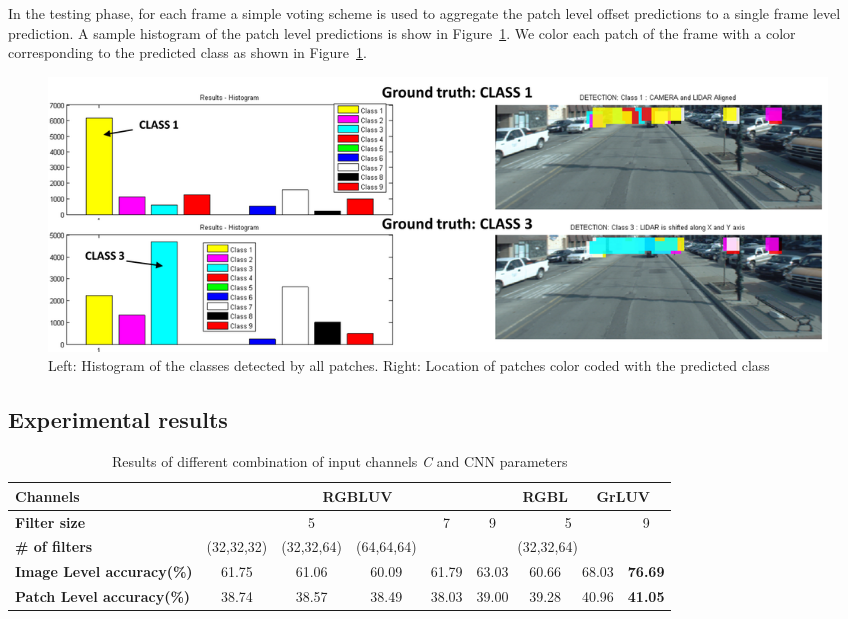 \documentclass{article}
\begin{document}
In the testing phase, for each frame a simple voting scheme is used to aggregate the patch level offset predictions to a single frame level prediction. A sample histogram of the patch level predictions is show in Figure~\ref{fig:Figures_Voting}. We color each patch of the frame with a color corresponding to the predicted class as shown in Figure~\ref{fig:Figures_Voting}. 

\begin{figure}[htbp]
    \centering
        \includegraphics[scale=0.35]{Voting_final.png}
    \caption{Left: Histogram of the classes detected by all patches. Right: Location of patches color coded with the predicted class}
    \label{fig:Figures_Voting}
\end{figure}


\subsection{Experimental results} %
\label{sub:experimental_results}

\begin{table}[ht]
\small
\caption{Results of different combination of input channels \emph{C} and CNN parameters}

\begin{center}
\begin{tabular}{|p{2cm}|c|c|c|c|c|c|c|c|} \hline
    \textbf{Channels} & \multicolumn{5}{|c|}{RGBLUV} & RGBL & \multicolumn{2}{|c|}{GrLUV} \\
    \hline
    \textbf{Filter size} &\multicolumn{3}{|c|}{5} & 7 & 9 & \multicolumn{2}{|c|}{5} & 9 \\
    \hline
    \textbf{\# of filters} & (32,32,32) & (32,32,64) & (64,64,64) & \multicolumn{5}{|c|}{(32,32,64)}  \\
    \hline
    \textbf{Image Level accuracy(\%)} & 61.75 & 61.06 & 60.09 & 61.79 & 63.03 & 60.66 & 68.03 & \textbf{76.69} \\
    \hline
    \textbf{Patch Level accuracy(\%)} & 38.74 & 38.57 & 38.49 & 38.03 & 39.00 & 39.28 & 40.96 & \textbf{41.05} \\
    \hline
\end{tabular}
\label{table:cnn_param}
\end{center}
\end{table}
\end{document}
